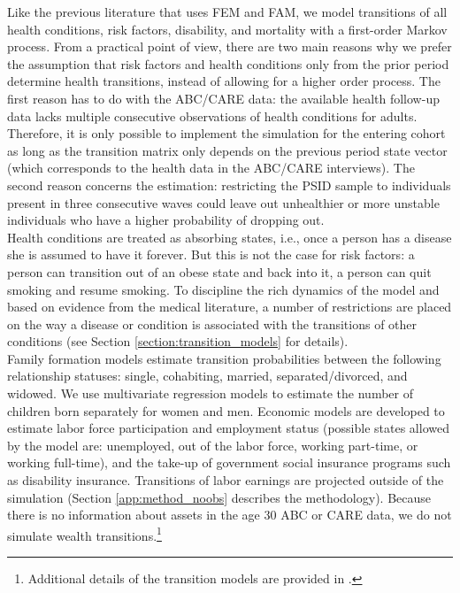 \noindent Like the previous literature that uses FEM and FAM, we model transitions of all health conditions, risk factors, disability, and mortality with a first-order Markov process. From a practical point of view, there are two main reasons why we prefer the assumption that risk factors and health conditions only from the prior period determine health transitions, instead of allowing for a higher order process. The first reason has to do with the ABC/CARE data: the available health follow-up data lacks multiple consecutive observations of health conditions for adults. Therefore, it is only possible to implement the simulation for the entering cohort as long as the transition matrix only depends on the previous period state vector (which corresponds to the health data in the ABC/CARE interviews). The second reason concerns the estimation: restricting the PSID sample to individuals present in three consecutive waves could leave out unhealthier or more unstable individuals who have a higher probability of dropping out. \\

\noindent Health conditions are treated as absorbing states, i.e., once a person has a disease she is assumed to have it forever. But this is not the case for risk factors: a person can transition out of an obese state and back into it, a person can quit smoking and resume smoking. To discipline the rich dynamics of the model and based on evidence from the medical literature, a number of restrictions are placed on the way a disease or condition is associated with the transitions of other conditions (see Section \ref{section:transition_models} for details).  \\

\noindent Family formation models estimate transition probabilities between the following relationship statuses:  single, cohabiting, married, separated/divorced, and widowed. We use multivariate regression models to estimate the number of children born separately for women and men. Economic models are developed to estimate labor force participation and employment status (possible states allowed by the model are: unemployed, out of the labor force, working part-time, or working full-time), and the take-up of government social insurance programs such as disability insurance. 
Transitions of labor earnings are projected outside of the simulation (Section \ref{app:method_noobs} describes the methodology).  Because there is no information about assets in the age 30 ABC or CARE data, we do not simulate wealth transitions.\footnote{Additional details of the transition models are provided in \citet{Goldman_etal_2015_Future-America-Model}.} \\

